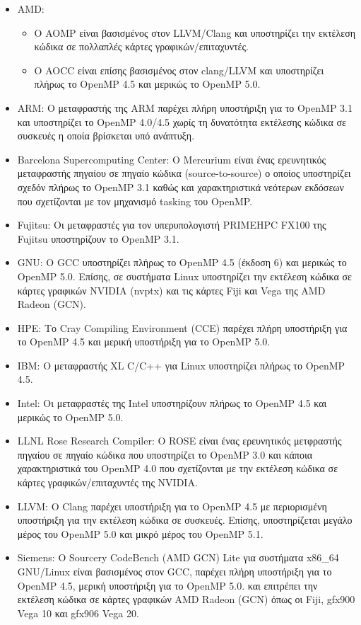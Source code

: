 \begin{itemize}
	\item AMD: 
	\begin{itemize}
		\item Ο AOMP είναι βασισμένος στον LLVM/Clang και υποστηρίζει την εκτέλεση κώδικα σε πολλαπλές κάρτες γραφικών/επιταχυντές.
		\item Ο AOCC είναι επίσης βασισμένος στον clang/LLVM και υποστηρίζει πλήρως το OpenMP 4.5 και μερικώς το OpenMP 5.0.
	\end{itemize}
	\item ARM: Ο μεταφραστής της ARM παρέχει πλήρη υποστήριξη για το OpenMP 3.1 και υποστηρίζει το OpenMP 4.0/4.5 χωρίς τη δυνατότητα εκτέλεσης κώδικα σε συσκευές η οποία βρίσκεται υπό ανάπτυξη.
	\item Barcelona Supercomputing Center: Ο Mercurium είναι ένας ερευνητικός μεταφραστής πηγαίου σε πηγαίο κώδικα (source-to-source) ο οποίος υποστηρίζει σχεδόν πλήρως το OpenMP 3.1 καθώς και χαρακτηριστικά νεότερων εκδόσεων που σχετίζονται με τον μηχανισμό tasking του OpenMP.
	\item Fujitsu: Οι μεταφραστές για τον υπερυπολογιστή PRIMEHPC FX100 της Fujitsu υποστηρίζουν το OpenMP 3.1.
	\item GNU: Ο GCC υποστηρίζει πλήρως το OpenMP 4.5 (έκδοση 6) και μερικώς το OpenMP 5.0. Επίσης, σε συστήματα Linux υποστηρίζει την εκτέλεση κώδικα σε κάρτες γραφικών NVIDIA (nvptx) και τις κάρτες Fiji και Vega της AMD Radeon (GCN).
	\item HPE: Το Cray Compiling Environment (CCE) παρέχει πλήρη υποστήριξη για το OpenMP 4.5 και μερική υποστήριξη για το OpenMP 5.0.
	\item IBM: Ο μεταφραστής XL C/C++ για Linux υποστηρίζει πλήρως το OpenMP 4.5.
	\item Intel: Οι μεταφραστές της Intel υποστηρίζουν πλήρως το OpenMP 4.5 και μερικώς το OpenMP 5.0.
	\item LLNL Rose Research Compiler: Ο ROSE είναι ένας ερευνητικός μετφραστής πηγαίου σε πηγαίο κώδικα που υποστηρίζει το OpenMP 3.0 και κάποια χαρακτηριστικά του OpenMP 4.0 που σχετίζονται με την εκτέλεση κώδικα σε κάρτες γραφικών/επιταχυντές της NVIDIA.
	\item LLVM: Ο Clang παρέχει υποστήριξη για το OpenMP 4.5 με περιορισμένη υποστήριξη για την εκτέλεση κώδικα σε συσκευές. Επίσης, υποστηρίζεται μεγάλο μέρος του OpenMP 5.0 και μικρό μέρος του OpenMP 5.1.
	\item Siemens: Ο Sourcery CodeBench (AMD GCN) Lite για συστήματα x86\_64 GNU/Linux είναι βασισμένος στον GCC, παρέχει πλήρη υποστήριξη για το OpenMP 4.5, μερική υποστήριξη για το OpenMP 5.0. και επιτρέπει την εκτέλεση κώδικα σε κάρτες γραφικών AMD Radeon (GCN) όπως οι Fiji, gfx900 Vega 10 και gfx906 Vega 20.	

\end{itemize}
